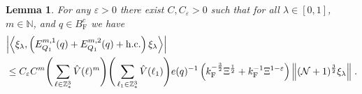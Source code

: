 \documentclass[12pt,a4paper]{article}
\numberwithin{equation}{section}
\newcommand{\NNN}{\mathbb{N}}
\newcommand{\1}{\mathbb{I}}
\newcommand{\F}{\mathrm{F}}
\newcommand{\Z}{\mathbb{Z}}
\newcommand{\NN}{\mathcal{N}}
\newcommand{\half}{\frac{1}{2}}
\newcommand{\eva}[1]{\left\langle #1 \right\rangle}
\theoremstyle{plain}
\newtheorem{lemma}[theorem]{Lemma}
\theoremstyle{definition}
\theoremstyle{remark}
\theoremstyle{plain}
\theoremstyle{definition}
\theoremstyle{remark}
\begin{document}
\begin{lemma} \label{lem:EQ111}
For any $ \varepsilon > 0 $ there exist $ C, C_\varepsilon > 0 $ such that for all $ \lambda \in [0,1] $, $ m \in \NNN $, and $ q \in B_{\F}^c $ we have
\begin{equation} \label{eq:estEQ111}
\begin{aligned}
	&\abs{\eva{\xi_\lambda,\left(E^{m,1}_{Q_1}(q) + E^{m,2}_{Q_1}(q) + \mathrm{h.c.}\right) \xi_\lambda }} \\
	&\leq C_\varepsilon C^m \Bigg(\sum_{\ell \in \Z^3_*} \hat{V}(\ell)^m\Bigg)
		\Bigg( \sum_{\ell_1 \in \Z^3_*} \hat{V}(\ell_1) \Bigg)
		e(q)^{-1} \left(
		k_{\F}^{-\frac{3}{2}} \Xi^\half
		+ k_{\F}^{-1}\Xi^{1-\varepsilon} \right)
		\norm{ (\NN+1)^{\frac 32} \xi_\lambda} \;.
\end{aligned}
\end{equation}
\end{lemma}
\end{document}

